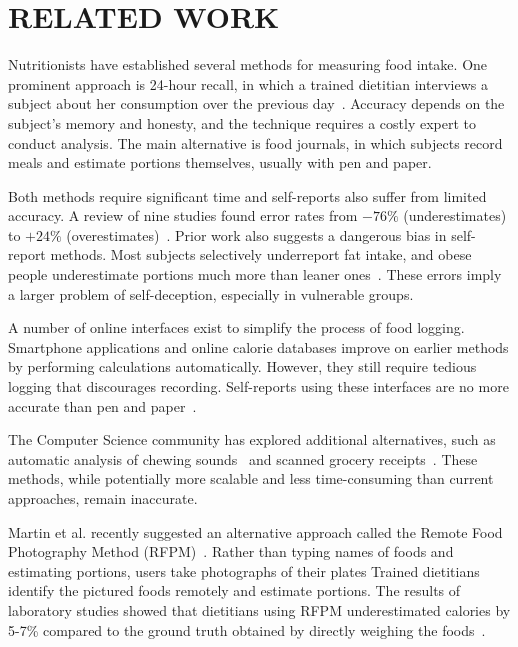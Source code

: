 \section{RELATED WORK}



Nutritionists have established several methods for measuring food
intake. One prominent approach is 24-hour recall, in which a trained
dietitian interviews a subject about her consumption over the previous
day~\cite{martin2009novel}. Accuracy depends on the subject's memory
and honesty, and the technique requires a costly expert to conduct
analysis. The main alternative is food journals, in which subjects
record meals and estimate portions themselves, usually with pen and
paper.

Both methods require significant time and self-reports also suffer from limited
accuracy. A review of nine studies found error rates from $-76\%$
(underestimates) to $+24\%$
(overestimates)~\cite{schoeller1990inaccuracies}. Prior work also
suggests a dangerous bias in self-report methods. Most subjects
selectively underreport fat intake, and obese people underestimate
portions much more than leaner
ones~\cite{pikholz2004under,goris2000undereating}. These errors imply
a larger problem of self-deception, especially in vulnerable groups.

A number of online interfaces exist to simplify the process of food
logging. Smartphone applications and online calorie databases improve
on earlier methods by performing calculations automatically. However,
they still require tedious logging that discourages
recording. Self-reports using these interfaces are no more accurate
than pen and paper~\cite{ann2006use,yon2007personal}.

The Computer Science community has explored additional alternatives,
such as automatic analysis of chewing sounds~\cite{amft05:analysis}
and scanned grocery receipts~\cite{mankoff02:using}.  These methods,
while potentially more scalable and less time-consuming than current
approaches, remain inaccurate.

Martin et al. recently suggested an alternative approach called the
Remote Food Photography Method (RFPM)~\cite{martin2009novel}. Rather
than typing names of foods and estimating portions, users take photographs of their plates  Trained dietitians identify the pictured foods remotely
and estimate portions.  The results of laboratory studies showed that
dietitians using RFPM underestimated calories by
5-7\% compared to the ground truth obtained by directly weighing the foods~\cite{martin2009novel}.


